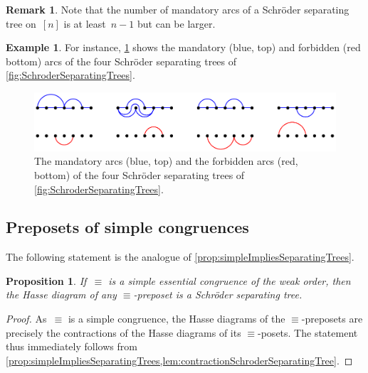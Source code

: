 \documentclass{amsart}
\newtheorem{proposition}[theorem]{Proposition}
\theoremstyle{definition}
\newtheorem{example}[theorem]{Example}
\newtheorem{remark}[theorem]{Remark}
\begin{document}
\begin{remark}
Note that the number of mandatory arcs of a Schröder separating tree on~$[n]$ is at least~$n-1$ but can be larger.
\end{remark}

\begin{example}
For instance, \cref{fig:mandatoryForbiddenArcsSchroderSeparatingTrees} shows the mandatory (blue, top) and forbidden (red bottom) arcs of the four Schröder separating trees of \cref{fig:SchroderSeparatingTrees}.
%
\begin{figure}
	\capstart
	\centerline{\includegraphics[scale=.85]{mandatoryForbiddenArcsSchroderSeparatingTrees}}
	\caption{The mandatory arcs (blue, top) and the forbidden arcs (red, bottom) of the four Schröder separating trees of \cref{fig:SchroderSeparatingTrees}.}
	\label{fig:mandatoryForbiddenArcsSchroderSeparatingTrees}
\end{figure}
%
\end{example}


\subsection{Preposets of simple congruences}
\label{subsec:preposetsSimpleCongruences}

The following statement is the analogue of \cref{prop:simpleImpliesSeparatingTrees}.

\begin{proposition}
\label{prop:simpleImpliesSchroderSeparatingTrees}
If~$\equiv$ is a simple essential congruence of the weak order, then the Hasse diagram of any $\equiv$-preposet is a Schröder separating tree.
\end{proposition}

\begin{proof}
As~$\equiv$ is a simple congruence, the Hasse diagrams of the $\equiv$-preposets are precisely the contractions of the Hasse diagrams of its $\equiv$-posets.
The statement thus immediately follows from \cref{prop:simpleImpliesSeparatingTrees,lem:contractionSchroderSeparatingTree}.
\end{proof}
\end{document}
